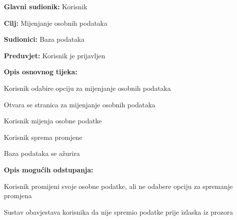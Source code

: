                         	\noindent {}
                        	\begin{packed_item}
                        		
                        		\item \textbf{Glavni sudionik: }Korisnik
                        		\item  \textbf{Cilj:} Mijenjanje osobnih podataka
                        		\item  \textbf{Sudionici:} Baza podataka
                        		\item  \textbf{Preduvjet:} Korisnik je prijavljen
                        		\item  \textbf{Opis osnovnog tijeka:}
                        		
                        		\item[] \begin{packed_enum}
                        			
                        			\item Korisnik odabire opciju za mijenjanje osobnih podataka
                        			\item Otvara se stranica za mijenjanje osobnih podataka
                        			\item Korisnik mijenja osobne podatke
                        			\item Korisnik sprema promjene
                        			\item Baza podataka se ažurira
                        		\end{packed_enum}
                        		
                        		\item  \textbf{Opis mogućih odstupanja:}
                        		
                        		\item[] \begin{packed_item}
                        			
                        			\item[3.a] Korisnik promijeni svoje osobne podatke, ali ne odabere opciju za spremanje promjena
                        			\item[] \begin{packed_enum}
                        				
                        				\item Sustav obavjestava korisnika da nije spremio podatke prije izlaska iz prozora
                        				
                        			\end{packed_enum}
                        			
                        			
                        		\end{packed_item}
                        	\end{packed_item}
